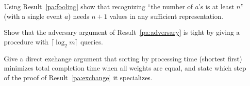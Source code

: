 \begin{exercise}
Using Result~\ref{pa:fooling} show that recognizing ``the number of $a$'s is at least $n$'' (with a single event $a$) needs $n+1$ values in any sufficient representation.
\end{exercise}

\begin{exercise}
Show that the adversary argument of Result~\ref{pa:adversary} is tight by giving a procedure with $\lceil\log_2m\rceil$ queries.
\end{exercise}

\begin{exercise}
Give a direct exchange argument that sorting by processing time (shortest first) minimizes total completion time when all weights are equal, and state which step of the proof of Result~\ref{pa:exchange} it specializes.
\end{exercise}
